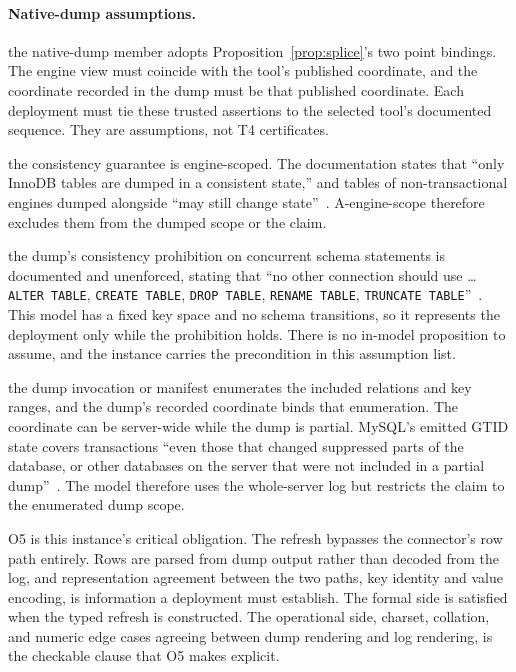 \documentclass[sigconf,nonacm,10pt]{acmart}
\theoremstyle{plain}
\theoremstyle{definition}
\begin{document}
\paragraph{Native-dump assumptions.}
\begin{description}
\RaggedRight
\item[\textbf{A-cert}, \textbf{A-scope}] the native-dump member
adopts Proposition~\ref{prop:splice}'s two point bindings. The
engine view must coincide with the tool's published coordinate, and
the coordinate recorded in the dump must be that published
coordinate. Each deployment must tie these trusted assertions to
the selected tool's documented sequence. They are assumptions, not
T4 certificates.
\item[\textbf{A-engine}, \textbf{A-engine-scope}] the consistency guarantee is
engine-scoped. The documentation states that ``only InnoDB tables are dumped in a consistent
state,'' and tables of non-transactional engines dumped alongside
``may still change state''~\cite{mysql_mysqldump}. A-engine-scope
therefore excludes them from the dumped scope or the claim.
\item[\textbf{A-ddl}] the dump's consistency prohibition on
concurrent schema statements is documented and unenforced, stating that ``no
other connection should use \ldots{} \texttt{ALTER TABLE},
\texttt{CREATE TABLE}, \texttt{DROP TABLE}, \texttt{RENAME
TABLE}, \texttt{TRUNCATE TABLE}''~\cite{mysql_mysqldump}. This
model has a fixed key space and no schema transitions, so it
represents the deployment only while the prohibition holds. There
is no in-model proposition to assume, and the instance carries the
precondition in this assumption list.
\item[\textbf{A-scope-witness}] the dump invocation or manifest
enumerates the included relations and key ranges, and the dump's
recorded coordinate binds that enumeration. The coordinate can be
server-wide while the dump is partial. MySQL's emitted GTID state
covers transactions ``even those that changed suppressed parts of
the database, or other databases on the server that were not
included in a partial dump''~\cite{mysql_mysqldump}. The model
therefore uses the whole-server log but restricts the claim to the
enumerated dump scope.
\end{description}

O5 is this instance's critical obligation. The refresh
bypasses the connector's row path entirely. Rows are parsed from
dump output rather than decoded from the log, and representation
agreement between the two paths, key identity and value encoding,
is information a deployment must establish. The formal side is
satisfied when the typed refresh is constructed. The operational side,
charset, collation, and numeric edge cases agreeing between dump
rendering and log rendering, is the checkable clause that O5 makes explicit.
\end{document}
